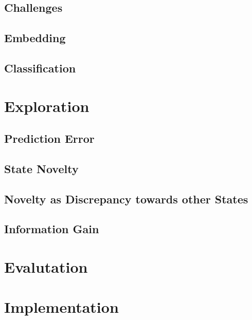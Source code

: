 \documentclass[draft,final]{vutinfth} %
\newcommand{\p}[1]{see p. #1}
\begin{document}
    \section{Challenges}


    \section{Embedding}


    \section{Classification}


    \chapter{Exploration}\label{sec:state_of_the_art}


    \section{Prediction Error}
    \cite[\p{7}]{schmidhuber_formal_2010}


    \section{State Novelty}


    \section{Novelty as Discrepancy towards other States}


    \section{Information Gain}



    \glsresetall


    \chapter{Evalutation}

    \citep{francois-lavet_introduction_2018}

    \glsresetall


    \chapter{Implementation}
    \citep{burda_large-scale_2018-1}
\end{document}
